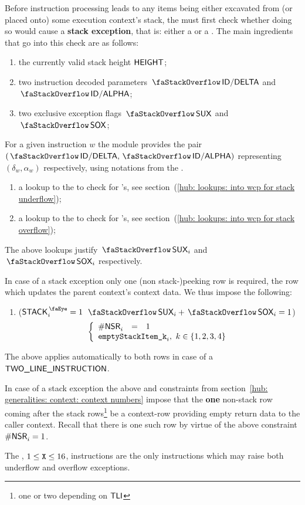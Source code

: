 \begin{center}
\end{center}

Before instruction processing leads to any items being either excavated from (or placed onto) some execution context's stack, the \zkEvm{} must first check whether doing so would cause a \textbf{stack exception}, that is: either a \suxSH{} or a \soxSH{}.
The main ingredients that go into this check are as follows:
\begin{enumerate}
	\item the currently valid stack height $\textsf{HEIGHT}$;
	\item two instruction decoded parameters $\stackDelta$ and $\stackAlpha$;
	\item two exclusive exception flags $\stackSux$ and $\stackSox{}$;
\end{enumerate}
\saNote{} For a given instruction $w$ the \idMod{} module provides the pair $(\stackDelta, \stackAlpha)$ representing $(\delta_{w},\alpha_{w})$ respectively, using notations from the \cite{EYP}.
\begin{enumerate}[resume]
	\item a lookup to the \wcpMod{} to check for \suxSH{}'s, see section~(\ref{hub: lookups: into wcp for stack underflow});
	\item a lookup to the \wcpMod{} to check for \soxSH{}'s, see section~(\ref{hub: lookups: into wcp for stack overflow});
\end{enumerate}
\saNote{} The above lookups justify $\stackSux_{i}$ and $\stackSox_{i}$ respectively.

In case of a stack exception only one (non stack-)peeking row is required, the row which updates the parent context's context data.
We thus impose the following:
\begin{enumerate}
	\item \If \Big($\peekStack_{i} = 1$ \et $\stackSux_{i} + \stackSox_{i} = 1$\Big) \Then
		\[
			\left\{ \begin{array}{lcl}
				\nonStackRows_{i} & = & 1 \\
				\multicolumn{3}{l}{\emptyStackItem{k}_{i}, ~ k\in\{1,2,3,4\}} \\
			\end{array} \right.
		\]
\end{enumerate}
\saNote{} The above applies automatically to both rows in case of a $\textsf{TWO\_LINE\_INSTRUCTION}{}$.

\saNote{} In case of a stack exception the above and constraints from section~\ref{hub: generalities: context: context numbers} impose that the \textbf{one} non-stack row coming after the stack rows\footnote{one or two depending on $\textsf{TLI}{}$} be a context-row providing empty return data to the caller context. Recall that there is one such row by virtue of the above constraint $\textsf{\#NSR}_{i} = 1$.

\saNote{} The , $1 \leq \texttt{X} \leq 16$, instructions are the only instructions which may raise both underflow and overflow exceptions.

